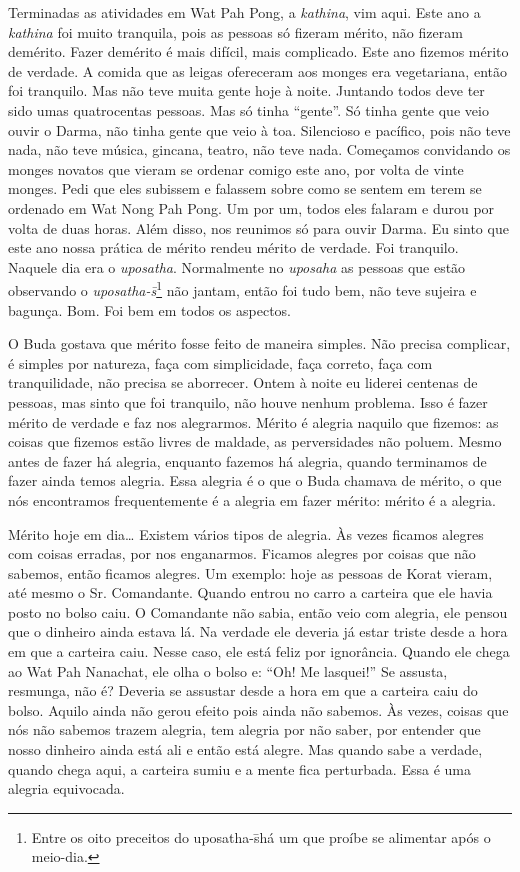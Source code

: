 Terminadas as atividades em Wat Pah Pong, a \textit{kathina}, vim
aqui. Este ano a \textit{kathina} foi muito tranquila, pois as pessoas
só fizeram mérito, não fizeram demérito. Fazer demérito é mais difícil,
mais complicado. Este ano fizemos mérito de verdade. A comida que as
leigas ofereceram aos monges era vegetariana, então foi tranquilo. Mas
não teve muita gente hoje à noite. Juntando todos deve ter sido umas
quatrocentas pessoas. Mas só tinha “gente”. Só tinha gente que veio
ouvir o Darma, não tinha gente que veio à toa. Silencioso e pacífico,
pois não teve nada, não teve música, gincana, teatro, não teve nada.
Começamos convidando os monges novatos que vieram se ordenar comigo
este ano, por volta de vinte monges. Pedi que eles subissem e falassem
sobre como se sentem em terem se ordenado em Wat Nong Pah Pong. Um por
um, todos eles falaram e durou por volta de duas horas. Além disso, nos
reunimos só para ouvir Darma. Eu sinto que este ano nossa prática de
mérito rendeu mérito de verdade. Foi tranquilo. Naquele dia era o
\textit{uposatha}. Normalmente no \textit{uposaha} as pessoas que estão
observando o \textit{uposatha-s\=\ila}\footnote{Entre os oito preceitos
do uposatha-s\=\ila há um que proíbe se alimentar após o meio-dia.} não
jantam, então foi tudo bem, não teve sujeira e bagunça. Bom. Foi bem em
todos os aspectos. 

O Buda gostava que mérito fosse feito de maneira simples. Não
precisa complicar, é simples por natureza, faça com simplicidade, faça
correto, faça com tranquilidade, não precisa se aborrecer. Ontem à
noite eu liderei centenas de pessoas, mas sinto que foi tranquilo, não
houve nenhum problema. Isso é fazer mérito de verdade e faz nos
alegrarmos. Mérito é alegria naquilo que fizemos: as coisas que fizemos
estão livres de maldade, as perversidades não poluem. Mesmo antes de
fazer há alegria, enquanto fazemos há alegria, quando terminamos de
fazer ainda temos alegria. Essa alegria é o que o Buda chamava de
mérito, o que nós encontramos frequentemente é a alegria em fazer
mérito: mérito é a alegria. 

Mérito hoje em dia… Existem vários tipos de alegria. Às vezes
ficamos alegres com coisas erradas, por nos enganarmos. Ficamos alegres
por coisas que não sabemos, então ficamos alegres. Um exemplo: hoje as
pessoas de Korat vieram, até mesmo o Sr. Comandante. Quando entrou no
carro a carteira que ele havia posto no bolso caiu. O Comandante não
sabia, então veio com alegria, ele pensou que o dinheiro ainda estava
lá. Na verdade ele deveria já estar triste desde a hora em que a
carteira caiu. Nesse caso, ele está feliz por ignorância. Quando ele
chega ao Wat Pah Nanachat, ele olha o bolso e: “Oh! Me lasquei!” Se
assusta, resmunga, não é? Deveria se assustar desde a hora em que a
carteira caiu do bolso. Aquilo ainda não gerou efeito pois ainda não
sabemos. Às vezes, coisas que nós não sabemos trazem alegria, tem
alegria por não saber, por entender que nosso dinheiro ainda está ali e
então está alegre. Mas quando sabe a verdade, quando chega aqui, a
carteira sumiu e a mente fica perturbada. Essa é uma alegria
equivocada. 

